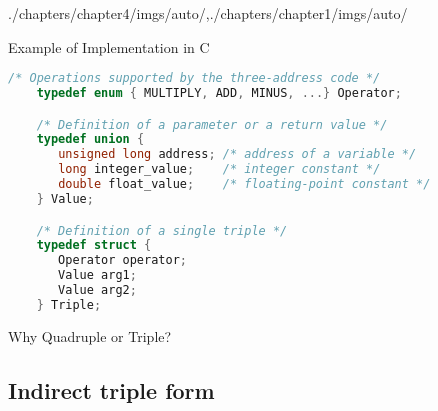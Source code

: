\begin{graphicspathcontext}{{./chapters/chapter4/imgs/auto/},{./chapters/chapter1/imgs/auto/}}
\begin{bibunit}[apalike]
\begin{frame}[background=6,fragile]{Example of Implementation in C}
	\begin{lstlisting}[language=C,basicstyle=\scriptsize]
	/* Operations supported by the three-address code */
	typedef enum { MULTIPLY, ADD, MINUS, ...} Operator;

	/* Definition of a parameter or a return value */
	typedef union { 
	   unsigned long address; /* address of a variable */
	   long integer_value;    /* integer constant */
	   double float_value;    /* floating-point constant */
	} Value;

	/* Definition of a single triple */
	typedef struct {
	   Operator operator;
	   Value arg1;
	   Value arg2;
	} Triple;
	\end{lstlisting}
\end{frame}

\begin{frame}{Why Quadruple or Triple?}
	\vspace{.25cm}
	\vspace{.25cm}
\end{frame}

\subsection{Indirect triple form}


\end{bibunit}
\end{graphicspathcontext}
